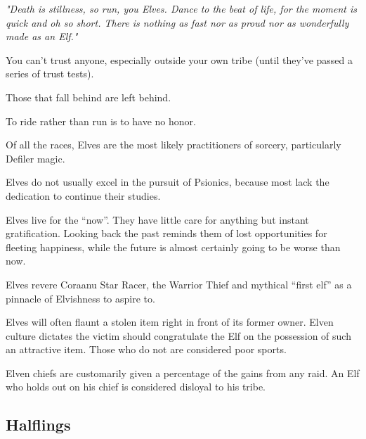 \begin{multicols}{2}
\begin{description}
    \item \textit{"Death is stillness, so run, you Elves. Dance to the beat of life, for the moment is quick and oh so short. There is nothing as fast nor as proud nor as wonderfully made as an Elf."}
    \item You can’t trust anyone, especially outside your own tribe (until they’ve passed a series of trust tests).
    \item Those that fall behind are left behind.
    \item To ride rather than run is to have no honor.
    \item Of all the races, Elves are the most likely practitioners of sorcery, particularly Defiler magic.
    \item Elves do not usually excel in the pursuit of Psionics, because most lack the dedication to continue their studies.
    \item Elves live for the “now”. They have little care for anything but instant gratification. Looking back the past reminds them of lost opportunities for fleeting happiness, while the future is almost certainly going to be worse than now.
    \item Elves revere Coraanu Star Racer, the Warrior Thief and mythical “first elf” as a pinnacle of Elvishness to aspire to.
    \item Elves will often flaunt a stolen item right in front of its former owner. Elven culture dictates the victim should congratulate the Elf on the possession of such an attractive item. Those who do not are considered poor sports.
    \item Elven chiefs are customarily given a percentage of the gains from any raid. An Elf who holds out on his chief is considered disloyal to his tribe.
\end{description}

\subsection{Halflings}


\end{multicols}
